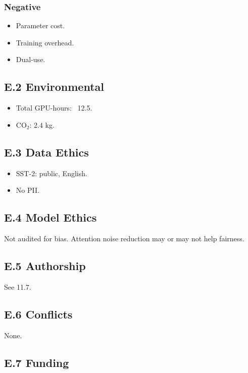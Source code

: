 \subsubsection{Negative}
\begin{itemize}
\item Parameter cost.
\item Training overhead.
\item Dual-use.

\end{itemize}
\subsection{E.2 Environmental}

\begin{itemize}
\item Total GPU-hours: ~12.5.
\item CO$_2$: 2.4 kg.

\end{itemize}
\subsection{E.3 Data Ethics}

\begin{itemize}
\item SST-2: public, English.
\item No PII.

\end{itemize}
\subsection{E.4 Model Ethics}

Not audited for bias. Attention noise reduction may or may not help fairness.

\subsection{E.5 Authorship}

See  11.7.

\subsection{E.6 Conflicts}

None.

\subsection{E.7 Funding}

